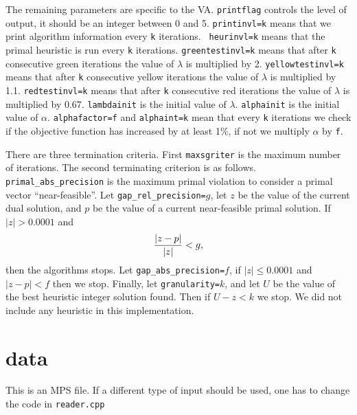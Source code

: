 \documentclass{article}
\begin{document}
The remaining parameters are specific to the VA. {\tt printflag} controls the
level of output, it should be an integer between 0 and 5. {\tt printinvl=k}
means that we print algorithm information every {\tt k} iterations. {\tt
heurinvl=k} means that the primal heuristic is run every {\tt k} iterations.
{\tt greentestinvl=k} means that after {\tt k} consecutive green iterations
the value of $\lambda$ is multiplied by 2. {\tt yellowtestinvl=k} means that
after {\tt k} consecutive yellow iterations the value of $\lambda$ is
multiplied by 1.1. {\tt redtestinvl=k} means that after {\tt k} consecutive
red iterations the value of $\lambda$ is multiplied by 0.67. {\tt lambdainit}
is the initial value of $\lambda$. {\tt alphainit} is the initial value of
$\alpha$. {\tt alphafactor=f} and {\tt alphaint=k} mean that every {\tt k}
iterations we check if the objective function has increased by at least 1\%,
if not we multiply $\alpha$ by {\tt f}.

There are three termination criteria. First {\tt maxsgriter} is the maximum
number of iterations. The second terminating criterion is as follows. {\tt
primal\_abs\_precision} is the maximum primal violation to consider a primal
vector ``near-feasible''. Let {\tt gap\_rel\_precision=$g$}, let $z$ be the
value of the current dual solution, and $p$ be the value of a current
near-feasible primal solution. If $|z| > 0.0001$ and
$$
        { | z - p | \over | z | } < g,
$$
then the algorithms stops. Let {\tt gap\_abs\_precision=$f$}, if $|z| \le
0.0001$ and $| z - p | < f$ then we stop. Finally, let {\tt granularity=$k$},
and let $U$ be the value of the best heuristic integer solution found. Then if
$ U - z < k$ we stop. We did not include any heuristic in this 
implementation.


\section{data}

This is an MPS file. If a different type of input should
be used, one has to change the code in {\tt reader.cpp}






\end{document}
